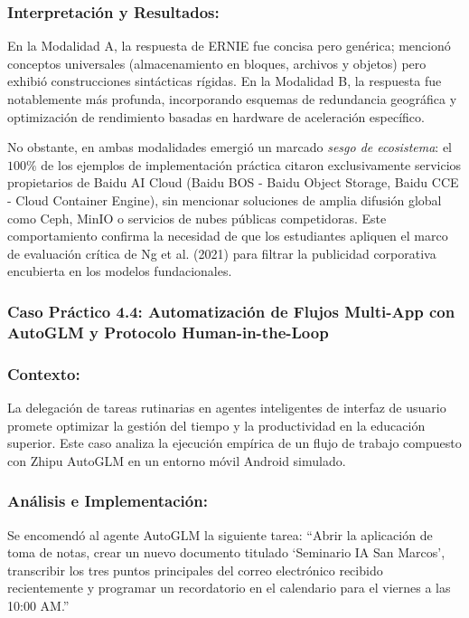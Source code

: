 \subsubsection*{Interpretación y Resultados:}
En la Modalidad A, la respuesta de ERNIE fue concisa pero genérica; mencionó conceptos universales (almacenamiento en bloques, archivos y objetos) pero exhibió construcciones sintácticas rígidas. En la Modalidad B, la respuesta fue notablemente más profunda, incorporando esquemas de redundancia geográfica y optimización de rendimiento basadas en hardware de aceleración específico.

No obstante, en ambas modalidades emergió un marcado \textit{sesgo de ecosistema}: el $100\%$ de los ejemplos de implementación práctica citaron exclusivamente servicios propietarios de Baidu AI Cloud (Baidu BOS - Baidu Object Storage, Baidu CCE - Cloud Container Engine), sin mencionar soluciones de amplia difusión global como Ceph, MinIO o servicios de nubes públicas competidoras. Este comportamiento confirma la necesidad de que los estudiantes apliquen el marco de evaluación crítica de Ng et al. (2021) para filtrar la publicidad corporativa encubierta en los modelos fundacionales.

\subsubsection{Caso Práctico 4.4: Automatización de Flujos Multi-App con AutoGLM y Protocolo Human-in-the-Loop}

\subsubsection*{Contexto:}
La delegación de tareas rutinarias en agentes inteligentes de interfaz de usuario promete optimizar la gestión del tiempo y la productividad en la educación superior. Este caso analiza la ejecución empírica de un flujo de trabajo compuesto con Zhipu AutoGLM en un entorno móvil Android simulado.

\subsubsection*{Análisis e Implementación:}
Se encomendó al agente AutoGLM la siguiente tarea: ``Abrir la aplicación de toma de notas, crear un nuevo documento titulado `Seminario IA San Marcos', transcribir los tres puntos principales del correo electrónico recibido recientemente y programar un recordatorio en el calendario para el viernes a las 10:00 AM.''

